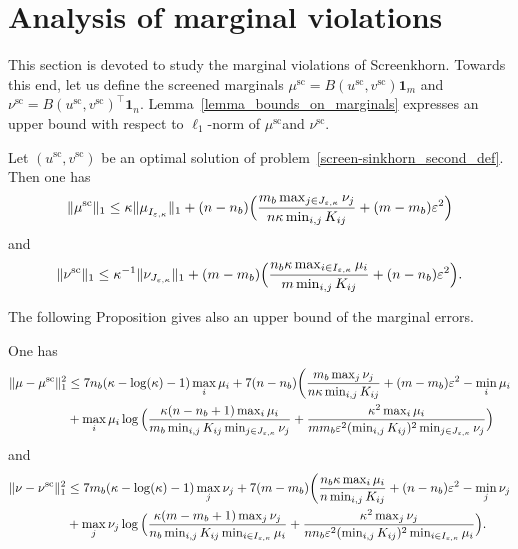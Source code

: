 
\section{Analysis of marginal violations} %
\label{sec:analysis_of_marginal_violations}

This section is devoted to study the marginal violations of Screenkhorn. Towards this end, let us define the screened marginals $\mu^{\text{sc}} = B(u^{\text{sc}}, v^{\text{sc}}) \mathbf 1_m$ and $\nu^{\text{sc}} = B(u^{\text{sc}}, v^{\text{sc}})^\top \mathbf 1_n.$ 
Lemma~\ref{lemma_bounds_on_marginals} expresses an upper bound with respect to $\ell_1$-norm of $\mu^{\text{sc}}$and $\nu^{\text{sc}}$. %


\begin{lemma}
\label{lemma_bounds_on_marginals}
Let $(u^{\text{sc}}, v^{\text{sc}})$ be an optimal solution of problem~\eqref{screen-sinkhorn_second_def}.
Then one has 
\begin{equation*}
\|\mu^{\text{sc}}\|_1 \leq \kappa \|\mu_{I_{\varepsilon,\kappa}}^{\text{}}\|_1 + (n-n_b) \Big(\frac{m_b\max_{j \in J_{\varepsilon,\kappa}} \nu_j}{n\kappa\min_{i,j}K_{ij}} + (m-m_b)\varepsilon^2 \Big)
\end{equation*}
and 
\begin{equation*}
\|\nu^{\text{sc}}\|_1 \leq \kappa^{-1} \|\nu_{J_{\varepsilon,\kappa}}\|_1 + (m-m_b)\Big(\frac{n_b\kappa \max_{i\in I_{\varepsilon,\kappa}}\mu_i}{m\min_{i,j}K_{ij}} + (n-n_b)\varepsilon^2\Big).
\end{equation*}
\end{lemma}
The following Proposition gives also an upper bound of the marginal errors.
\begin{proposition}
\label{proposition_error_in_marginals}
One has 
\begin{align*} %
{\norm{{\mu} -{\mu}^{\text{sc}}}^2_1}&\leq 7n_b(\kappa-\log(\kappa)-1)\max_{i} \mu_i + 7 (n-n_b)\bigg(\frac{m_b\max_{j}\nu_j}{n\kappa\min_{i,j} K_{ij}} + (m- m_b) \varepsilon^2 - \min_{i}\mu_i\\
&+ \max_{i} \mu_i\log\Big(\frac{\kappa(n-n_b+ 1)\max_{i} \mu_i}{m_b\min_{i,j}K_{ij}\min_{j \in J_{\varepsilon,\kappa}}\nu_j} + \frac{\kappa^2\max_{i} \mu_i}{mm_b\varepsilon^2(\min_{i,j}K_{ij})^2\min_{j \in J_{\varepsilon,\kappa}}\nu_j}\Big)%
\end{align*}
and 
\begin{align*} %
{\norm{{\nu} -{\nu}^{\text{sc}}}^2_1} &\leq 7m_b(\kappa-\log(\kappa)-1)\max_{j} \nu_j + 7(m-m_b)\bigg(\frac{n_b\kappa\max_{i}\mu_i}{n\min_{i,j} K_{ij}} + (n- n_b) \varepsilon^2 - \min_{j}\nu_j\\
&+ \max_{j} \nu_j\log\Big(\frac{\kappa(m-m_b+ 1)\max_{j} \nu_j}{n_b\min_{i,j}K_{ij}\min_{i \in I_{\varepsilon,\kappa}}\mu_i} + \frac{\kappa^2\max_{j} \nu_j}{nn_b\varepsilon^2(\min_{i,j}K_{ij})^2\min_{i \in I_{\varepsilon,\kappa}}\mu_i}\Big).%
\end{align*}

\end{proposition}


